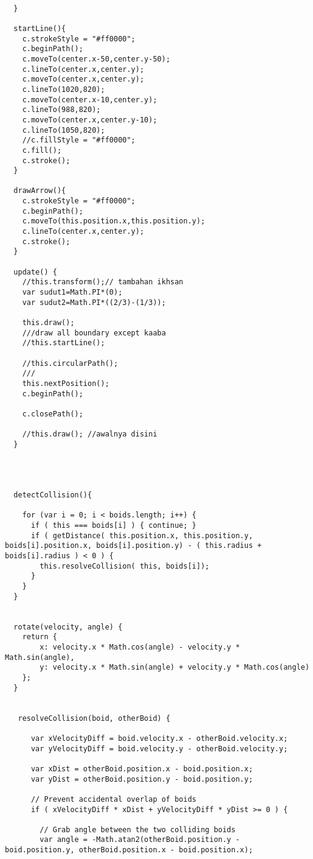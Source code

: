 \begin{lstlisting}
 
  }

  startLine(){
    c.strokeStyle = "#ff0000";
    c.beginPath();
    c.moveTo(center.x-50,center.y-50);
    c.lineTo(center.x,center.y);
    c.moveTo(center.x,center.y);
    c.lineTo(1020,820);
    c.moveTo(center.x-10,center.y);
    c.lineTo(988,820);
    c.moveTo(center.x,center.y-10);
    c.lineTo(1050,820);
    //c.fillStyle = "#ff0000";
    c.fill();
    c.stroke();
  }

  drawArrow(){
    c.strokeStyle = "#ff0000";
    c.beginPath();
    c.moveTo(this.position.x,this.position.y);
    c.lineTo(center.x,center.y);
    c.stroke();
  }
  
  update() { 
    //this.transform();// tambahan ikhsan
    var sudut1=Math.PI*(0);
    var sudut2=Math.PI*((2/3)-(1/3));

    this.draw();
    ///draw all boundary except kaaba
    //this.startLine();
    
    //this.circularPath();
    ///
    this.nextPosition();
    c.beginPath();

    c.closePath();

    //this.draw(); //awalnya disini
  }




  detectCollision(){

    for (var i = 0; i < boids.length; i++) {
      if ( this === boids[i] ) { continue; }
      if ( getDistance( this.position.x, this.position.y, boids[i].position.x, boids[i].position.y) - ( this.radius + boids[i].radius ) < 0 ) {
        this.resolveCollision( this, boids[i]);
      }
    }
  }


  rotate(velocity, angle) {
    return {
        x: velocity.x * Math.cos(angle) - velocity.y * Math.sin(angle),
        y: velocity.x * Math.sin(angle) + velocity.y * Math.cos(angle)
    };
  }


   resolveCollision(boid, otherBoid) {

      var xVelocityDiff = boid.velocity.x - otherBoid.velocity.x;
      var yVelocityDiff = boid.velocity.y - otherBoid.velocity.y;

      var xDist = otherBoid.position.x - boid.position.x;
      var yDist = otherBoid.position.y - boid.position.y;

      // Prevent accidental overlap of boids
      if ( xVelocityDiff * xDist + yVelocityDiff * yDist >= 0 ) {

        // Grab angle between the two colliding boids
        var angle = -Math.atan2(otherBoid.position.y - boid.position.y, otherBoid.position.x - boid.position.x);


\end{lstlisting}
